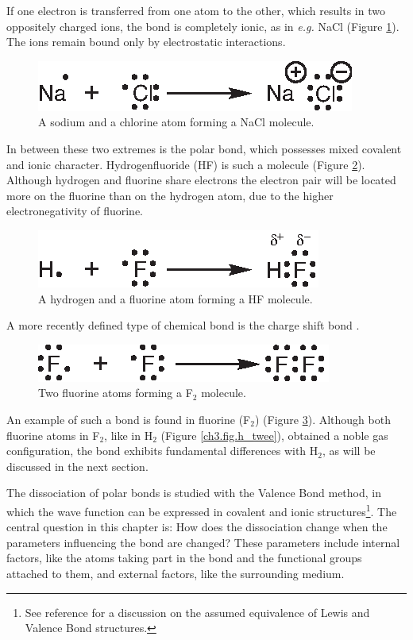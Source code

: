 If one electron is transferred from one atom to the other, which results in two oppositely charged ions, the bond is completely ionic, as in \textit{e.g.} NaCl (Figure \ref{ch3.fig.nacl}). The ions remain bound only by electrostatic interactions. 
\begin{figure}[ht]
\center
\includegraphics{dissociation/figures/nacl.eps}
\caption{A sodium and a chlorine atom forming a NaCl molecule.}
\label{ch3.fig.nacl}
\end{figure}

In between these two extremes is the polar bond, which possesses mixed covalent and ionic character. Hydrogenfluoride (HF) is such a molecule (Figure \ref{ch3.fig.hf}). Although hydrogen and fluorine share electrons the electron pair will be located more on the fluorine than on the hydrogen atom, due to the higher electronegativity of fluorine.
\begin{figure}[ht]
\center
\includegraphics{dissociation/figures/hf.eps}
\caption{A hydrogen and a fluorine atom forming a HF molecule.}
\label{ch3.fig.hf}
\end{figure}

A more recently defined type of chemical bond is the charge shift bond \cite{cs1,cs2}.
\begin{figure}[h]
\center
\includegraphics{dissociation/figures/f_twee.eps}
\caption{Two fluorine atoms forming a F$_2$ molecule.}
\label{ch3.fig.f_twee} 
\end{figure}
 An example of such a bond is found in fluorine (F$_2$)  (Figure \ref{ch3.fig.f_twee}). Although both fluorine atoms in F$_2$, like in H$_2$ (Figure \ref{ch3.fig.h_twee}), obtained a noble gas configuration, the bond exhibits fundamental differences with H$_2$, as will be discussed in the next section.

The dissociation of polar bonds is studied with the Valence Bond method, in which the wave function can be expressed in covalent and ionic structures\footnote{See reference \cite{interpret} for a discussion on the assumed equivalence of Lewis and Valence Bond structures.}. The central question in this chapter is: How does the dissociation change when the parameters influencing the bond are changed? These parameters include internal factors, like the atoms taking part in the bond and the functional groups attached to them, and external factors, like the surrounding medium. 

